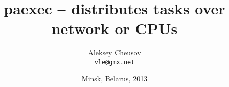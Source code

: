 \documentclass[hyperref={colorlinks=true}]{beamer}
\title{paexec -- distributes tasks over network or CPUs}
\author{Aleksey Cheusov \\ \texttt{vle@gmx.net}}
\date{Minsk, Belarus, 2013}
\begin{document}

\newenvironment{CodeSmall}[1]%
               {\Verbatim[label=\bf{#1},frame=single,%
                   fontsize=\footnotesize,%
                   commandchars=\\\{\}]}%
               {\endVerbatim}
\newenvironment{CodeSmallNoLabel}%
               {\Verbatim[frame=single,%
                   fontsize=\footnotesize,%
                   commandchars=\\\{\}]}%
               {\endVerbatim}

\newenvironment{Code}[1]%
              {\Verbatim[label=\bf{#1},frame=single,%
                  fontsize=\small,%
                  commandchars=\\\{\}]}%
              {\endVerbatim}
\newenvironment{CodeNoLabel}%
               {\Verbatim[frame=single,%
                   fontsize=\small,%
                   commandchars=\\\{\}]}%
               {\endVerbatim}

\newenvironment{CodeLarge}[1]%
               {\Verbatim[label=\bf{#1},frame=single,%
                   fontsize=\large,%
                   commandchars=\\\{\}]}%
               {\endVerbatim}
\newenvironment{CodeLargeNoLabel}%
               {\Verbatim[frame=single,%
                   fontsize=\large,%
                   commandchars=\\\{\}]}%
               {\endVerbatim}

\newcommand{\prompt}[1]{{\bf{#1}}}
\newcommand{\h}[1]{{\bf{#1}}}
\newcommand{\URL}[1]{\textbf{#1}}
\newcommand{\AutohellFile}[1]{\textcolor{red}{#1}}
\newcommand{\MKCfile}[1]{\textcolor{green}{#1}}
\newcommand{\ModuleName}[1]{\textbf{#1}\textnormal{}}
\newcommand{\ProgName}[1]{\textbf{#1}\textnormal{}}
\newcommand{\ProjectName}[1]{\textbf{#1}\textnormal{}}
\newcommand{\PackageName}[1]{\textbf{#1}\textnormal{}}
\newcommand{\MKC}[1]{\large\textsf{#1}\textnormal{}\normalsize}

\end{document}
